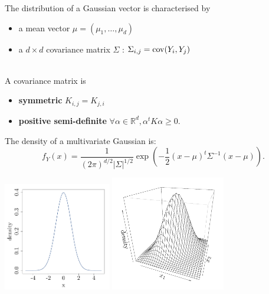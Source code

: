 \begin{frame}{}
The distribution of a Gaussian vector is characterised by
\begin{itemize}
 	\item a mean vector $\mu = (\mu_1, \dots, \mu_d)$
 	\item a $d \times d$ covariance matrix $\Sigma$ : $\Sigma_{i,j}=\operatorname*{cov}(Y_i, Y_j)$
\end{itemize}
\vspace{5mm}
\\
A covariance matrix is
\begin{itemize}
	\item \textbf{symmetric} $K_{i,j}=K_{j,i}$
	\item \textbf{positive semi-definite} $\forall \alpha \in \mathds{R}^d, \alpha^t K \alpha \geq 0$.
\end{itemize}
\end{frame}

\begin{frame}{}
The density of a multivariate Gaussian is:
\begin{equation*}
f_Y(x) = \frac{1}{\displaystyle (2 \pi)^{d/2} |\Sigma|^{1/2}} \exp \left(-\frac12 (x-\mu)^t \Sigma^{-1} (x-\mu)  \right).
\end{equation*}
\begin{center}
 \includegraphics[height=4.7cm]{1_stat_models/figures/R/MVN_dens1} \qquad \includegraphics[height=5cm]{1_stat_models/figures/R/MVN_dens2}
\end{center}
\end{frame}


